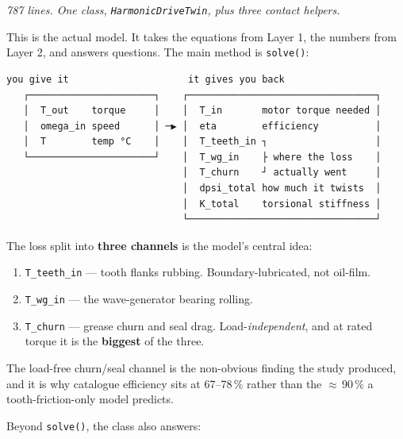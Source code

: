 \documentclass[11pt,a4paper]{article}
\newcommand{\pkg}[1]{\texttt{#1}}
\begin{document}
\emph{787 lines. One class, \pkg{HarmonicDriveTwin}, plus three contact
helpers.}

This is the actual model. It takes the equations from Layer 1, the numbers from
Layer 2, and answers questions. The main method is \pkg{solve()}:

\begin{Verbatim}[fontsize=\small,xleftmargin=10pt]
         you give it                     it gives you back
   ┌──────────────────────┐    ┌─────────────────────────────────┐
   │  T_out    torque     │    │  T_in       motor torque needed │
   │  omega_in speed      │ ─▶ │  eta        efficiency          │
   │  T        temp °C    │    │  T_teeth_in ┐                   │
   └──────────────────────┘    │  T_wg_in    ├ where the loss    │
                               │  T_churn    ┘ actually went     │
                               │  dpsi_total how much it twists  │
                               │  K_total    torsional stiffness │
                               └─────────────────────────────────┘
\end{Verbatim}

The loss split into \textbf{three channels} is the model's central idea:

\begin{enumerate}
  \item \pkg{T\_teeth\_in} --- tooth flanks rubbing. Boundary-lubricated, not
        oil-film.
  \item \pkg{T\_wg\_in} --- the wave-generator bearing rolling.
  \item \pkg{T\_churn} --- grease churn and seal drag. Load-\emph{independent},
        and at rated torque it is the \textbf{biggest} of the three.
\end{enumerate}

\begin{keyresult}
The load-free churn/seal channel is the non-obvious finding the study produced,
and it is why catalogue efficiency sits at 67--78\,\% rather than the
$\approx$\,90\,\% a tooth-friction-only model predicts.
\end{keyresult}

Beyond \pkg{solve()}, the class also answers:
\end{document}
